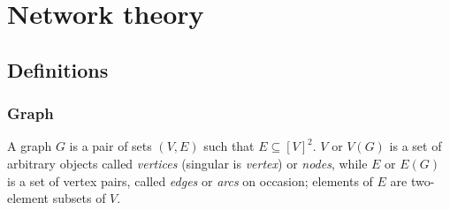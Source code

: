 \chapter{Network theory}

  \section{Definitions}
        
    \subsection{Graph}

      A graph $G$ is a pair of sets $(V, E)$ such that $E \subseteq [V]^2$. $V$ or $V(G)$ is a set of arbitrary objects called \emph{vertices} (singular is \emph{vertex}) or \emph{nodes}, while $E$ or $E(G)$ is a set of vertex pairs, called \emph{edges} or \emph{arcs} on occasion; elements of $E$ are two-element subsets of $V$\cite{Diestel2012}.
      
